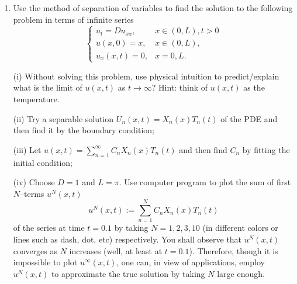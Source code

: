 \documentclass[6pt]{article}
\newtheorem{solution}{Solution}
\numberwithin{equation}{section}
\begin{document}
\begin{enumerate}
\begin{solution}
According to the Sturm--Liouville Theory, we are able to write the solution in terms of the infinite series
\[u(x,t)=\sum_{n=1}^\infty C_n(t) \sin \frac{n\pi (x+L)}{2L}.\]
Substituting this solution into the PDE gives us
\[\sum_{n=1}^\infty C_n'(t) \sin \frac{n\pi (x+L)}{2L}=-D\sum_{n=1}^\infty C_n(t) \Big(\frac{n\pi}{2L}\Big)^2\sin \frac{n\pi (x+L)}{2L};\]
Multiplying BHS of the system above by $X_n(x)$ and then integrating it over $(-L,L)$, we obtain that
\[C_n'(t)=- D \Big(\frac{n\pi}{2L}\Big)^2C_n(t);\]
solving this ODE gives us
\[C_n(t)=C_n(0)e^{-D(\frac{n\pi}{2L})^2t},\]
where $C_n(0)$ can be evaluated by the initial condition as
\[C_n(0)=\frac{1}{L}\int_{-L}^L \phi(x) \sin \frac{n\pi (x+L)}{2L}dx.\]
\end{solution}


\item  Use the method of separation of variables to find the solution to the following problem in terms of infinite series
\begin{equation}
\left\{
\begin{array}{ll}
u_t=Du_{xx},& x\in (0,L), t>0\\
u(x,0)=x, &x\in(0,L), \\
u_x(x,t)=0, & x=0,L.
\end{array}
\right.
\end{equation}

(i) Without solving this problem, use physical intuition to predict/explain what is the limit of $u(x,t)$ as $t\rightarrow \infty$?  Hint: think of $u(x,t)$ as the temperature.

(ii)  Try a separable solution $U_n(x,t)=X_n(x)T_n(t)$ of the PDE and then find it by the boundary condition;

(iii)  Let $u(x,t)=\sum^\infty_{n=1}C_nX_n(x)T_n(t)$ and then find $C_n$ by fitting the initial condition;

(iv)  Choose $D=1$ and $L=\pi$.  Use computer program to plot the sum of first $N$--terms $u^N(x,t)$
\[u^N(x,t):=\sum^N_{n=1}C_nX_n(x)T_n(t)\]
of the series at time $t=0.1$ by taking $N=1, 2, 3, 10$ (in different colors or lines such as dash, dot, etc) respectively.  You shall observe that $u^N(x,t)$ converges as $N$ increases (well, at least at $t=0.1$).  Therefore, though it is impossible to plot $u^\infty(x,t)$, one can, in view of applications, employ $u^N(x,t)$ to approximate the true solution by taking $N$ large enough.


\end{enumerate}
\end{document}

